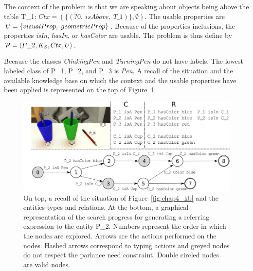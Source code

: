 The context of the problem is that we are speaking about objects being above the table T\_1: $Ctx = (\{(?0,\ isAbove,\ T\_1)\}, \emptyset)$. The usable properties are $U = \{visualProp,\ geometricProp\}$. Because of the properties inclusions, the properties \textit{isIn}, \textit{hasIn}, or \textit{hasColor} are usable. The problem is thus define by $\mathcal{P} = \langle P\_2, K_S, Ctx, U \rangle$.

Because the classes \textit{ClinkingPen} and \textit{TurningPen} do not have labels, The lowest labeled class of P\_1, P\_2, and P\_3 is \textit{Pen}. A recall of the situation and the available knowledge base on which the context and the usable properties have been applied is represented on the top of Figure~\ref{fig:chap4_search}.

\begin{figure}[h!]
\centering
\includegraphics[scale=0.45]{figures/chapter4/search.png}
\caption{\label{fig:chap4_search} On top, a recall of the situation of Figure~\ref{fig:chap4_kb} and the entities types and relations.
At the bottom, a graphical representation of the search progress for generating a referring expression to the entity P\_2. Numbers represent the order in which the nodes are explored. Arrows are the actions performed on the nodes. Hashed arrows correspond to typing actions and greyed nodes do not respect the parlance need constraint. Double circled nodes are valid nodes. }
\end{figure}

